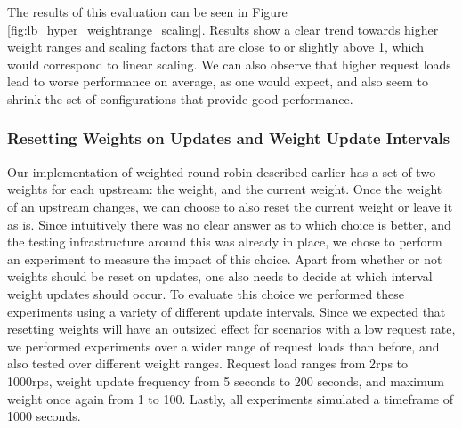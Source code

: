 \documentclass[draft,final]{vutinfth} %
\begin{document}
The results of this evaluation can be seen in Figure \ref{fig:lb_hyper_weightrange_scaling}.
Results show a clear trend towards higher weight ranges and scaling factors that are close to or slightly above 1, which would correspond to linear scaling.
We can also observe that higher request loads lead to worse performance on average, as one would expect, and also seem to shrink the set of configurations that provide good performance.

\subsubsection{Resetting Weights on Updates and Weight Update Intervals}
Our implementation of weighted round robin described earlier has a set of two weights for each upstream: the weight, and the current weight.
Once the weight of an upstream changes, we can choose to also reset the current weight or leave it as is.
Since intuitively there was no clear answer as to which choice is better, and the testing infrastructure around this was already in place, we chose to perform an experiment to measure the impact of this choice.
Apart from whether or not weights should be reset on updates, one also needs to decide at which interval weight updates should occur.
To evaluate this choice we performed these experiments using a variety of different update intervals.
Since we expected that resetting weights will have an outsized effect for scenarios with a low request rate, we performed experiments over a wider range of request loads than before, and also tested over different weight ranges.
Request load ranges from 2\gls{rps} to 1000\gls{rps}, weight update frequency from 5 seconds to 200 seconds, and maximum weight once again from 1 to 100.
Lastly, all experiments simulated a timeframe of 1000 seconds.
\end{document}
